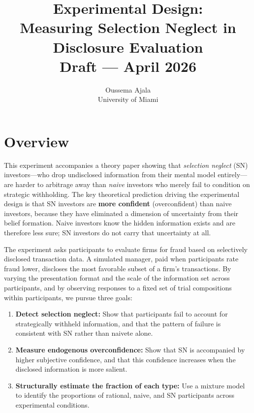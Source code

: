 \documentclass[12pt]{article}
\title{Experimental Design: \\ Measuring Selection Neglect in Disclosure Evaluation \\[6pt] \large Draft --- April 2026}
\author{Oussema Ajala \\ University of Miami}
\date{}
\theoremstyle{definition}
\begin{document}
\maketitle

\section{Overview}
\label{sec:overview}

This experiment accompanies a theory paper showing that \emph{selection neglect} (SN) investors---who drop undisclosed information from their mental model entirely---are harder to arbitrage away than \emph{naive} investors who merely fail to condition on strategic withholding. The key theoretical prediction driving the experimental design is that SN investors are \textbf{more confident} (overconfident) than naive investors, because they have eliminated a dimension of uncertainty from their belief formation. Naive investors know the hidden information exists and are therefore less sure; SN investors do not carry that uncertainty at all.

The experiment asks participants to evaluate firms for fraud based on selectively disclosed transaction data. A simulated manager, paid when participants rate fraud lower, discloses the most favorable subset of a firm's transactions. By varying the presentation format and the scale of the information set across participants, and by observing responses to a fixed set of trial compositions within participants, we pursue three goals:

\begin{enumerate}[nosep]
\item \textbf{Detect selection neglect:} Show that participants fail to account for strategically withheld information, and that the pattern of failure is consistent with SN rather than naivete alone.
\item \textbf{Measure endogenous overconfidence:} Show that SN is accompanied by higher subjective confidence, and that this confidence increases when the disclosed information is more salient.
\item \textbf{Structurally estimate the fraction of each type:} Use a mixture model to identify the proportions of rational, naive, and SN participants across experimental conditions.
\end{enumerate}
\end{document}
